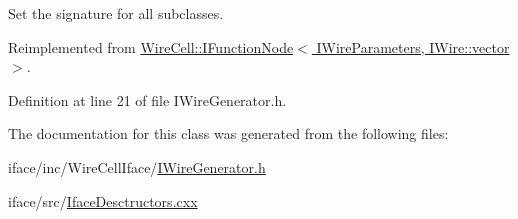 Set the signature for all subclasses. 



Reimplemented from \hyperlink{class_wire_cell_1_1_i_function_node_af59f46cf19ca9fdf4aade1f289feedf2}{Wire\+Cell\+::\+I\+Function\+Node$<$ I\+Wire\+Parameters, I\+Wire\+::vector $>$}.



Definition at line 21 of file I\+Wire\+Generator.\+h.



The documentation for this class was generated from the following files\+:\begin{DoxyCompactItemize}
\item 
iface/inc/\+Wire\+Cell\+Iface/\hyperlink{_i_wire_generator_8h}{I\+Wire\+Generator.\+h}\item 
iface/src/\hyperlink{_iface_desctructors_8cxx}{Iface\+Desctructors.\+cxx}\end{DoxyCompactItemize}
